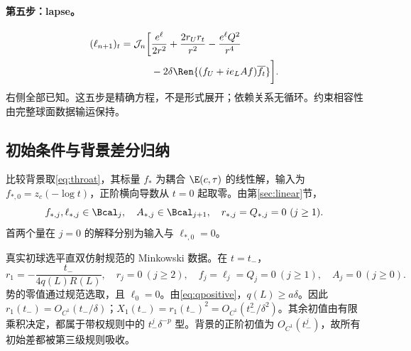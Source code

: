 \paragraph{第五步：lapse。}
\begin{equation}\label{eq:ltransport}
\begin{aligned}
(\ell_{n+1})_t=\mathcal J_n\biggl[&\frac{e^\ell}{2r^2}
+\frac{2r_Ur_t}{r^2}-\frac{e^\ell Q^2}{r^4}\\
&-2\delta\Ren\{(f_U+ie_LAf)\overline{f_t}\}\biggr].
\end{aligned}
\end{equation}
右侧全部已知。这五步是精确方程，不是形式展开；依赖关系无循环。约束相容性由完整球面数据输运保持。

\subsection{初始条件与背景差分归纳}
比较背景取\eqref{eq:throat}，其标量 $f_*$ 为耦合 $\E(c,\tau)$ 的线性解，输入为 $f_{*,0}=z_c(-\log t)$，正阶横向导数从 $t=0$ 起取零。由第\ref{sec:linear}节，
\begin{equation}\label{eq:background-B}
f_{*,j},\ell_{*,j}\in\Bcal_j,\quad
A_{*,j}\in\Bcal_{j+1},\quad r_{*,j}=Q_{*,j}=0\ (j\ge1).
\end{equation}
首两个量在 $j=0$ 的解释分别为输入与 $\ell_{*,0}=0$。

真实初球选平直双仿射规范的 Minkowski 数据。在 $t=t_-$，
\begin{equation}\label{eq:initialjets}
r_1=-\frac{t_-}{4q(L)R(L)},\quad r_j=0\ (j\ge2),
\quad f_j=\ell_j=Q_j=0\ (j\ge1),\quad A_j=0\ (j\ge0).
\end{equation}
势的零值通过规范选取，且 $\ell_0=0$。由\eqref{eq:qpositive}，$q(L)\ge a\delta$。因此 $r_1(t_-)=O_{C^1}(t_-/\delta)$；$X_1(t_-)=r_1(t_-)^2=O_{C^1}(t_-^2/\delta^2)$。其余初值由有限乘积决定，都属于带权规则中的 $t_-^j\delta^{-p}$ 型。背景的正阶初值为 $O_{C^1}(t_-^j)$，故所有初始差都被第三级规则吸收。

